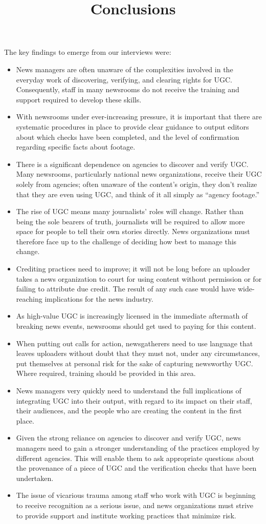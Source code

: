 \documentclass[symmetric, notoc, nobib]{towcenter-book}
\begin{document}
The key findings to emerge from our interviews were:
\begin{itemize}
\item News managers are often unaware of the complexities
involved in the everyday work of discovering, verifying, and
clearing rights for UGC. Consequently, staff in many newsrooms
do not receive the training and support required to develop
these skills.
\item With newsrooms under ever-increasing pressure, it is important
that there are systematic procedures in place to provide
clear guidance to output editors about which checks have been
completed, and the level of confirmation regarding specific facts
about footage.
\item There is a significant dependence on agencies to discover and
verify UGC. Many newsrooms, particularly national news organizations,
receive their UGC solely from agencies; often unaware
of the content's origin, they don't realize that they are even using
UGC, and think of it all simply as ``agency footage.''
\title{Conclusions}
\item The rise of UGC means many journalists' roles will change.
Rather than being the sole bearers of truth, journalists will be
required to allow more space for people to tell their own stories
directly. News organizations must therefore face up to the challenge
of deciding how best to manage this change.
\item Crediting practices need to improve; it will not be long before
an uploader takes a news organization to court for using content
without permission or for failing to attribute due credit. The
result of any such case would have wide-reaching implications
for the news industry.
\item As high-value UGC is increasingly licensed in the immediate
aftermath of breaking news events, newsrooms should get used
to paying for this content.
\item When putting out calls for action, newsgatherers need to use
language that leaves uploaders without doubt that they must not,
under any circumstances, put themselves at personal risk for the
sake of capturing newsworthy UGC. Where required, training
should be provided in this area.
\item News managers very quickly need to understand the full implications
of integrating UGC into their output, with regard to its
impact on their staff, their audiences, and the people who are
creating the content in the first place.
\item Given the strong reliance on agencies to discover and verify
UGC, news managers need to gain a stronger understanding
of the practices employed by different agencies. This will
enable them to ask appropriate questions about the provenance
of a piece of UGC and the verification checks that have
been undertaken.
\item The issue of vicarious trauma among staff who work with UGC
is beginning to receive recognition as a serious issue, and news
organizations must strive to provide support and institute working
practices that minimize risk.
\end{itemize}
\end{document}
